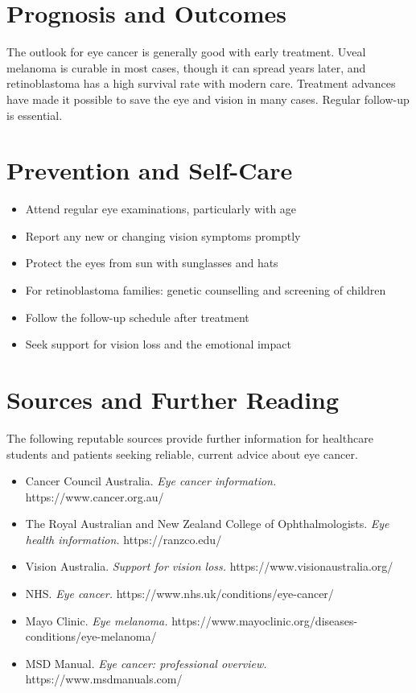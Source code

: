 \section*{Prognosis and Outcomes}
The outlook for eye cancer is generally good with early treatment. Uveal melanoma is curable in most cases, though it can spread years later, and retinoblastoma has a high survival rate with modern care. Treatment advances have made it possible to save the eye and vision in many cases. Regular follow-up is essential.

\section*{Prevention and Self-Care}
\begin{itemize}
    \item Attend regular eye examinations, particularly with age
    \item Report any new or changing vision symptoms promptly
    \item Protect the eyes from sun with sunglasses and hats
    \item For retinoblastoma families: genetic counselling and screening of children
    \item Follow the follow-up schedule after treatment
    \item Seek support for vision loss and the emotional impact
\end{itemize}

\section*{Sources and Further Reading}
The following reputable sources provide further information for healthcare students and patients seeking reliable, current advice about eye cancer.
\begin{itemize}
    \item Cancer Council Australia. \textit{Eye cancer information.} https://www.cancer.org.au/
    \item The Royal Australian and New Zealand College of Ophthalmologists. \textit{Eye health information.} https://ranzco.edu/
    \item Vision Australia. \textit{Support for vision loss.} https://www.visionaustralia.org/
    \item NHS. \textit{Eye cancer.} https://www.nhs.uk/conditions/eye-cancer/
    \item Mayo Clinic. \textit{Eye melanoma.} https://www.mayoclinic.org/diseases-conditions/eye-melanoma/
    \item MSD Manual. \textit{Eye cancer: professional overview.} https://www.msdmanuals.com/
\end{itemize}
